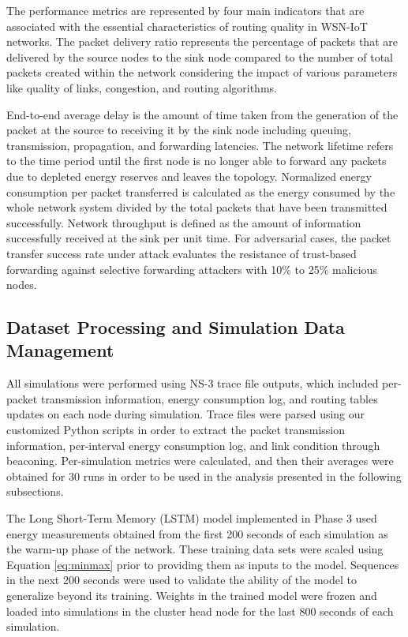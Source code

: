 \documentclass[a4paper,fleqn]{cas-dc}
\numberwithin{equation}{section}
\begin{document}
The performance metrics are represented by four main indicators
that are associated with the essential characteristics of routing
quality in WSN-IoT networks.\cite{Tahsien2020MLIoTSecurity,R22_Tiwari2025ChallengesIoTDevices}
The packet delivery ratio represents the percentage of packets that are
delivered by the source nodes to the sink node compared to the number of
total packets created within the network considering the impact of various
parameters like quality of links, congestion, and routing algorithms.

End-to-end average delay is the amount of time taken from the generation
of the packet at the source to receiving it by the sink node including
queuing, transmission, propagation, and forwarding latencies.
The network lifetime refers to the time period until the first node is no
longer able to forward any packets due to depleted energy reserves and leaves
the topology.\cite{R9_Tumula2025OptimizingIoTSDNBlockchain,Madhavan2025DesigningSecureIoT}
Normalized energy consumption per packet transferred is calculated as
the energy consumed by the whole network system divided by the total
packets that have been transmitted successfully. Network throughput is
defined as the amount of information successfully received at the sink
per unit time. For adversarial cases, the packet transfer success rate
under attack evaluates the resistance of trust-based forwarding against
selective forwarding attackers with 10\% to 25\% malicious nodes.

\subsection{Dataset Processing and Simulation Data Management}
\label{subsec:dataset}

All simulations were performed using NS-3 trace file outputs, which
included per-packet transmission information, energy consumption log, and routing tables updates on each node during simulation.
\cite{R8_Mahanipour2024FeatureEngineeringIDS,R3_Narkedimilli2025AdaptiveCurriculumIoT}
Trace files were parsed using our customized Python scripts in order to extract the packet transmission information,
per-interval energy consumption log, and link condition through beaconing. Per-simulation metrics were calculated, and then their averages were obtained for 30 runs
in order to be used in the analysis presented in the following subsections.

The Long Short-Term Memory (LSTM) model implemented in Phase 3 used energy measurements obtained from the first 200 seconds of each simulation as the warm-up phase of the network.\cite{R7_Baral2024AdaptiveEndToEndIoT} These training data sets were scaled using Equation \ref{eq:minmax} prior to providing them as inputs to the model. Sequences in the next 200 seconds were used to validate the ability of the model to generalize beyond its training. Weights in the trained model were frozen and loaded into simulations in the cluster head node for the last 800 seconds of each simulation.
\end{document}
